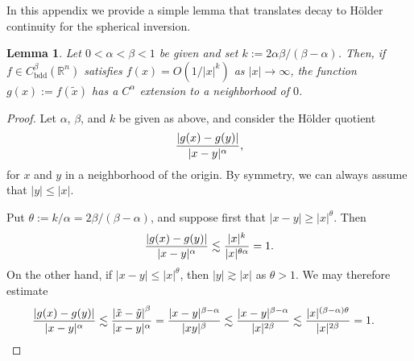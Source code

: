 \documentclass[11pt,reqno]{amsart}
\newcommand\bdd{{\mathrm{bdd}}}
\theoremstyle{plain}
\newtheorem{lemma}[theorem]{Lemma}
\theoremstyle{remark}
\numberwithin{equation}{section}
\begin{document}
In this appendix we provide a simple lemma that translates decay to H\"older continuity for the spherical inversion.
\begin{lemma}\label{lem inversion}
Let $0 < \alpha < \beta < 1$ be given and set $k := 2\alpha \beta/(\beta - \alpha)$.  Then, if $f \in C_\bdd^\beta(\mathbb R^n)$ satisfies $f(x) = O(1/|x|^k)$ as $|x| \to \infty$, the function $g(x) := f(\tilde x)$ has a $C^\alpha$ extension to a neighborhood of $0$. 
\end{lemma}
\begin{proof}
Let $\alpha$, $\beta$, and $k$ be given as above, and consider the H\"older quotient
\[
{|g(x) - g(y)| \over |x-y|^\alpha},
\] 
for $x$ and $y$ in a neighborhood of the origin.  By symmetry, we can always assume that $|y| \le |x|$. 

Put $\theta := k/\alpha = 2\beta /(\beta - \alpha)$, and suppose first that $|x - y| \ge |x|^\theta$. Then
\begin{align*}
{|g(x) - g(y)| \over |x-y|^\alpha} \lesssim {|x|^k \over |x|^{\theta\alpha}} = 1.
\end{align*}
On the other hand, if $|x-y| \le |x|^\theta$, then $|y| \gtrsim |x|$ as $\theta > 1$.  We may therefore estimate
\begin{align*}
  {|g(x) - g(y)| \over |x-y|^\alpha} 
  &\lesssim {\left|\tilde x - \tilde y \right|^\beta \over |x-y|^\alpha} 
   = {|x - y|^{\beta - \alpha} \over |xy|^\beta}    \lesssim {|x - y|^{\beta - \alpha} \over |x|^{2\beta}} \lesssim {|x|^{(\beta - \alpha) \theta} \over |x|^{2\beta}} = 1. \qedhere \end{align*}
\end{proof}



\end{document}
